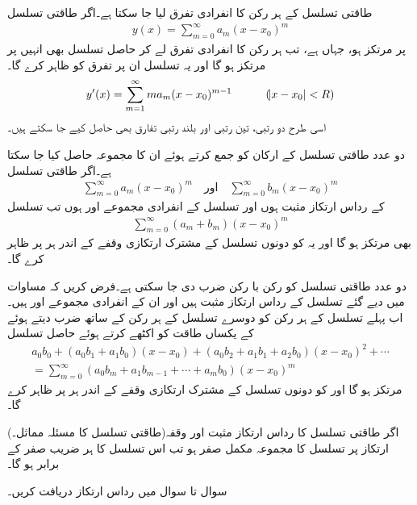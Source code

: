 \quad طاقتی تسلسل کے ہر رکن کا انفرادی تفرق لیا جا سکتا ہے۔اگر طاقتی تسلسل
\begin{align*}
y(x)=\sum_{m=0}^{\infty}a_m(x-x_0)^m
\end{align*}
  پر مرتکز ہو، جہاں  ہے، تب ہر رکن کا انفرادی تفرق لے کر حاصل تسلسل بھی انہیں  پر مرتکز ہو گا اور یہ تسلسل ان  پر  تفرق   کو ظاہر کرے گا۔ 
 \begin{align*}
y'(x)=\sum_{m=1}^{\infty} ma_m(x-x_0)^{m-1}\quad \quad \quad (\abs{x-x_0}<R)
\end{align*}
 اسی طرح دو رتبی، تین رتبی اور بلند رتبی تفارق بھی حاصل کیے جا سکتے ہیں۔

\quad دو عدد طاقتی تسلسل کے ارکان کو جمع کرتے ہوئے ان کا مجموعہ حاصل کیا جا سکتا ہے۔اگر طاقتی تسلسل
\begin{align}\label{مساوات_بیسل_دو_عدد_تسلسل_الف}
\sum_{m=0}^{\infty} a_m(x-x_0)^m\quad \text{اور} \quad \sum_{m=0}^{\infty} b_m(x-x_0)^m
\end{align}
کے رداس ارتکاز مثبت ہوں اور تسلسل کے انفرادی مجموعے  اور  ہوں تب تسلسل
\begin{align*}
\sum_{m=0}^{\infty} (a_m+b_m)(x-x_0)^m
\end{align*}
بھی مرتکز ہو گا اور یہ  کو  دونوں تسلسل کے مشترک ارتکازی وقفے کے اندر ہر  پر ظاہر کرے گا۔

\quad دو عدد طاقتی تسلسل کو رکن با رکن ضرب دی جا سکتی ہے۔فرض کریں کہ مساوات  میں دیے گئے تسلسل کے رداس ارتکاز مثبت ہیں اور ان کے انفرادی مجموعے  اور  ہیں۔اب پہلے تسلسل کے ہر رکن کو دوسرے تسلسل کے ہر رکن کے ساتھ ضرب دیتے ہوئے  کے یکساں طاقت کو اکٹھے کرتے ہوئے حاصل تسلسل
\begin{multline*}
a_0b_0+(a_0b_1+a_1b_0)(x-x_0)+(a_0b_2+a_1b_1+a_2b_0)(x-x_0)^2+\cdots\\
=\sum_{m=0}^{\infty} (a_0b_m+a_1b_{m-1}+\cdots+a_mb_0)(x-x_0)^m
\end{multline*}
مرتکز ہو گا اور  کو دونوں تسلسل کے مشترک ارتکازی وقفے کے اندر ہر  پر ظاہر کرے گا۔

 (طاقتی تسلسل کا مسئلہ  مماثل۔)\quad اگر طاقتی تسلسل کا رداس ارتکاز مثبت اور وقفہ ارتکاز پر تسلسل کا مجموعہ مکمل صفر ہو تب اس تسلسل کا ہر  ضریب  صفر کے برابر ہو گا۔

سوال  تا سوال  میں رداس ارتکاز دریافت کریں۔


